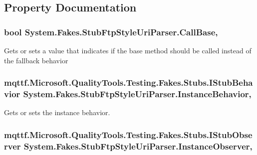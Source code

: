 \subsection{Property Documentation}
\hypertarget{class_system_1_1_fakes_1_1_stub_ftp_style_uri_parser_a409869927304ec5aa3779d5c53128854}{
\subsubsection[{Call\-Base}]{\setlength{\rightskip}{0pt plus 5cm}bool System.\-Fakes.\-Stub\-Ftp\-Style\-Uri\-Parser.\-Call\-Base\hspace{0.3cm}{\ttfamily [get]}, {\ttfamily [set]}}}\label{class_system_1_1_fakes_1_1_stub_ftp_style_uri_parser_a409869927304ec5aa3779d5c53128854}


Gets or sets a value that indicates if the base method should be called instead of the fallback behavior

\hypertarget{class_system_1_1_fakes_1_1_stub_ftp_style_uri_parser_a0637317330717cc540ede70520b4fa0c}{
\subsubsection[{Instance\-Behavior}]{\setlength{\rightskip}{0pt plus 5cm}mqttf.\-Microsoft.\-Quality\-Tools.\-Testing.\-Fakes.\-Stubs.\-I\-Stub\-Behavior System.\-Fakes.\-Stub\-Ftp\-Style\-Uri\-Parser.\-Instance\-Behavior\hspace{0.3cm}{\ttfamily [get]}, {\ttfamily [set]}}}\label{class_system_1_1_fakes_1_1_stub_ftp_style_uri_parser_a0637317330717cc540ede70520b4fa0c}


Gets or sets the instance behavior.

\hypertarget{class_system_1_1_fakes_1_1_stub_ftp_style_uri_parser_a0c4db71e063a463f8ec69097f6f1cfef}{
\subsubsection[{Instance\-Observer}]{\setlength{\rightskip}{0pt plus 5cm}mqttf.\-Microsoft.\-Quality\-Tools.\-Testing.\-Fakes.\-Stubs.\-I\-Stub\-Observer System.\-Fakes.\-Stub\-Ftp\-Style\-Uri\-Parser.\-Instance\-Observer\hspace{0.3cm}{\ttfamily [get]}, {\ttfamily [set]}}}\label{class_system_1_1_fakes_1_1_stub_ftp_style_uri_parser_a0c4db71e063a463f8ec69097f6f1cfef}


